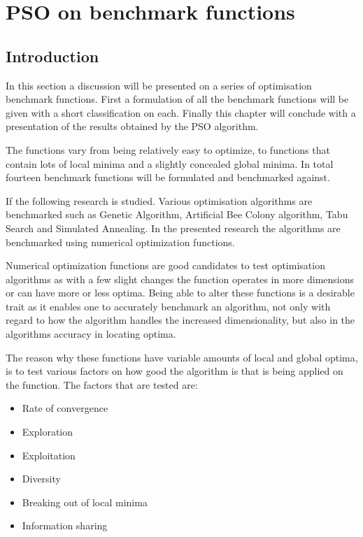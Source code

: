 \chapter{PSO on benchmark functions}
\label{chpt:benchmark}
\section{Introduction}
In this section a discussion will be presented on a series of optimisation benchmark functions. First a formulation of all the benchmark functions will be given with a short classification on each. Finally this chapter will conclude with a presentation of the results obtained by the PSO algorithm.

The functions vary from being relatively easy to optimize, to functions that contain lots of local minima and a slightly concealed global minima. In total fourteen benchmark functions will be formulated and benchmarked against.

If the following research \cite{devparallelgasa,CompuIntelligenceIntro,FundamentalSwarm} is studied. Various optimisation algorithms are benchmarked such as Genetic Algorithm, Artificial Bee Colony algorithm, Tabu Search and Simulated Annealing. In the presented research the algorithms are benchmarked using numerical optimization functions.

Numerical optimization functions are good candidates to test optimisation algorithms as with a few slight changes the function operates in more dimensions or can have more or less optima\cite{devparallelgasa,CompuIntelligenceIntro,FundamentalSwarm}. Being able to alter these functions is a desirable trait as it enables one to accurately benchmark an algorithm, not only with regard to how the algorithm handles the increased dimensionality, but also in the algorithms accuracy in locating optima\cite{devparallelgasa,CompuIntelligenceIntro,FundamentalSwarm}.

The reason why these functions have variable amounts of local and global optima, is to test various factors on how good the algorithm is that is being applied on the function. The factors that are tested are\cite{CompuIntelligenceIntro,FundamentalSwarm}:
\begin{itemize}
\item Rate of convergence
\item Exploration
\item Exploitation
\item Diversity
\item Breaking out of local minima
\item Information sharing
\end{itemize}

